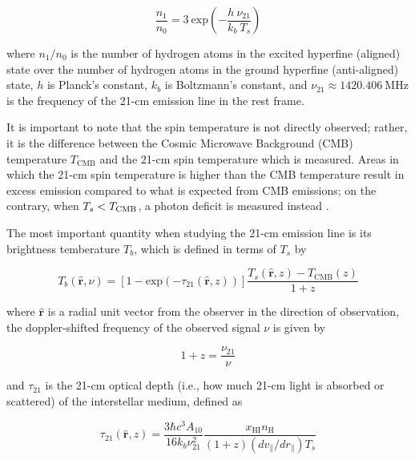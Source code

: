 \documentclass[floats,floatfix,showpacs,amssymb,prd,superscriptaddress,nofootinbib]{revtex4-2} %
\newcommand{\lt}{\ensuremath <}
\begin{document}
\begin{equation}
    \frac{n_1}{n_0} = 3 ~ \text{exp} \left( -\frac{h ~ \nu_{21}}{k_b ~ T_s} \right)
\end{equation}

\noindent where $n_1/n_0$ is the number of hydrogen atoms in the excited hyperfine (aligned) state over the number of hydrogen atoms in the ground hyperfine (anti-aligned) state, $h$ is Planck's constant, $k_b$ is Boltzmann's constant, and $\nu_{21} \approx 1420.406 ~\text{MHz}$ is the frequency of the 21-cm emission line in the rest frame. 

It is important to note that the spin temperature is not directly observed; rather, it is the difference between the Cosmic Microwave Background (CMB) temperature $T_{\text{CMB}}$ and the 21-cm spin temperature which is measured. Areas in which the 21-cm spin temperature is higher than the CMB temperature result in excess emission compared to what is expected from CMB emissions; on the contrary, when $T_s \lt T_{\text{CMB}}$, a photon deficit is measured instead \citep{Liu_Shaw_2020}.

The most important quantity when studying the 21-cm emission line is its brightness temberature $T_b$, which is defined in terms of $T_s$ by \citep{Furlanetto_2006}

\begin{equation}
    T_b (\hat{\textbf{r}}, \nu) = \left[1 - \text{exp}(-\tau_{21}(\hat{\textbf{r}}, z)) \right] \frac{T_s(\hat{\textbf{r}}, z) - T_{\text{CMB}} (z)}{1 + z}
\end{equation}

\noindent where $\hat{\textbf{r}}$ is a radial unit vector from the observer in the direction of observation, the doppler-shifted frequency of the observed signal $\nu$ is given by \citep{Liu_Shaw_2020}

\begin{equation}
    1 + z = \frac{\nu_{21}}{\nu}
\end{equation}

\noindent and $\tau_{21}$ is the 21-cm optical depth (i.e., how much 21-cm light is absorbed or scattered) of the interstellar medium, defined as \citep{Liu_Shaw_2020}

\begin{equation}
    \tau_{21} (\hat{\textbf{r}}, z) = \frac{3 \hbar c^3 A_{10}}{16 k_b \nu^2_{21}} \frac{x_{\mathrm{HI}} n_\mathrm{H}}{(1 + z) (dv_{\parallel} / dr_{\parallel}) T_s}
    \label{eq:optical_depth}
\end{equation}
\end{document}
